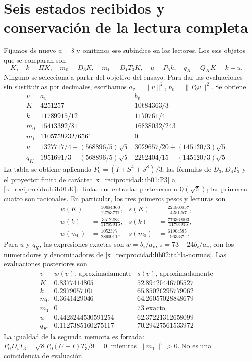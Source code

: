 \section{Seis estados recibidos y conservación de la lectura completa}
\label{x_reciprocidad:lib02:seis-estados}

Fijamos de nuevo \(a=8\) y omitimos ese subíndice en los lectores.
Los seis objetos que se comparan son
\[
 K,\quad k=\Pi K,\quad m_0=D_3K,\quad m_1=D_4T_3K,
 \quad u=P_3k,\quad q_K=Q_KK=k-u.
\]
Ninguno se selecciona a partir del objetivo del ensayo. Para dar las
evaluaciones sin sustituirlas por decimales, escribamos
\(a_v=\|v\|^2\), \(b_v=\|P_0v\|^2\). Se obtiene
\begin{equation}
\begin{array}{c|c|c}
 v&a_v&b_v\\\hline
 K&4251257&10684363/3\\
 k&11789915/12&1170761/4\\
 m_0&15413392/81&16838032/243\\
 m_1&1105759232/6561&0\\
 u&1327717/4+(568896/5)\sqrt5
   &3029657/20+(145120/3)\sqrt5\\
 q_K&1951691/3-(568896/5)\sqrt5
   &2292404/15-(145120/3)\sqrt5
\end{array}
 \label{x_reciprocidad:lib02:tabla-normas}
\end{equation}
La tabla se obtiene aplicando \(P_0=(I+S^4+S^8)/3\), las fórmulas
de \(D_3,D_4T_3\) y el proyector finito de carácter
\eqref{x_reciprocidad:lib01:P3} a \eqref{x_reciprocidad:lib01:K}. Todas sus entradas pertenecen a
\(\mathbb Q(\sqrt5)\); las primeras cuatro son racionales. En
particular, los tres primeros pesos y lecturas son
\begin{align*}
 w(K)&=\frac{10684363}{12753771},&
 s(K)&=\frac{224866857}{4251257},\\
 w(k)&=\frac{3512283}{11789915},&
 s(k)&=\frac{776369003}{11789915},\\
 w(m_0)&=\frac{1052377}{2890011},&
 s(m_0)&=\frac{61904585}{963337}.
\end{align*}
Para \(u\) y \(q_K\), las expresiones exactas son
\(w=b_v/a_v\), \(s=73-24b_v/a_v\), con los numeradores y
denominadores de \eqref{x_reciprocidad:lib02:tabla-normas}. Las evaluaciones posteriores
son
\[
\begin{array}{c|c|c}
 v&w(v)\text{, aproximadamente}&s(v)\text{, aproximadamente}\\\hline
 K&0.8377414805&52.89420446705527\\
 k&0.2979057101&65.85026295779062\\
 m_0&0.3641429046&64.26057028848679\\
 m_1&0&73\text{ exacto}\\
 u&0.4428244530591254&62.37221312658099\\
 q_K&0.1127385160275117&70.29427561533972
\end{array}
\]
La igualdad de la segunda memoria es forzada:
\(P_0D_4T_3=\sqrt8P_0(U-I)T_3/9=0\), mientras
\(\|m_1\|^2>0\). No es una coincidencia de evaluación.

